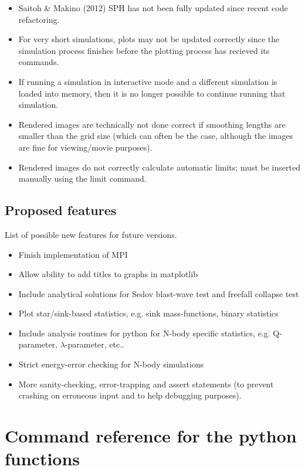 \documentclass[a4paper]{article}
\begin{document}
\begin{itemize}
\item Saitoh \& Makino (2012) SPH has not been fully updated since recent code refactoring.
\item For very short simulations, plots may not be updated correctly since the simulation process finishes before the plotting process has recieved its commands.
\item If running a simulation in interactive mode and a different simulation is loaded into memory, then it is no longer possible to continue running that simulation.
\item Rendered images are technically not done correct if smoothing lengths are smaller than the grid size (which can often be the case, although the images are fine for viewing/movie purposes).
\item Rendered images do not correctly calculate automatic limits; must be inserted manually using the limit command.
\end{itemize}


\subsection{Proposed features}
List of possible new features for future versions.

\begin{itemize}
\item Finish implementation of MPI
\item Allow ability to add titles to graphs in matplotlib
\item Include analytical solutions for Sedov blast-wave test and freefall collapse test
\item Plot star/sink-based statistics, e.g. sink mass-functions, binary statistics
\item Include analysis routines for python for N-body specific statistics, e.g. Q-parameter, $\lambda$-parameter, etc..
\item Strict energy-error checking for N-body simulations
\item More sanity-checking, error-trapping and assert statements (to prevent crashing on erroneous input and to help debugging purposes).
\end{itemize}

\newpage

\appendix

\def\tableofcontents{}
\section{Command reference for the python functions}
\label{reference_facade}

\end{document}
